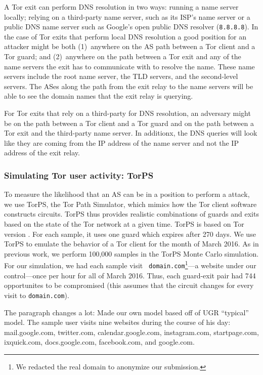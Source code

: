 A Tor exit can perform DNS resolution in two ways: running a name server
locally; relying on a third-party name server, such as its ISP's name
server or a public DNS name server such as Google's open public DNS
resolver ({\tt 8.8.8.8}).  In the case of Tor
exits that perform local DNS resolution a good position for an attacker
might be both (1)~anywhere on the AS path between a Tor client and a Tor
guard; and (2)~anywhere on the path between a Tor exit and any of the
name servers the exit has to communicate with to resolve the name.
These name servers include the root name server, the TLD servers, and
the second-level servers.  The ASes along the path from the exit relay
to the name servers will be able to see the domain names that the exit
relay is querying.

For Tor exits that rely on a third-party for DNS resolution, an
adversary might be on the path between a Tor client and a
Tor guard and on the path between a Tor exit and the third-party name
server.  In additionx, the DNS queries will look like they are coming
from the IP address of the name server and not the IP address of the
exit relay.

\subsubsection{Simulating Tor user activity: TorPS}

To measure the likelihood that an AS can be in a position to perform a
\name attack, we use TorPS, the Tor Path Simulator, which mimics how the
Tor client software constructs circuits.  TorPS thus provides realistic
combinations of guards and exits based on the state of the Tor network
at a given time. TorPS is based on Tor version . For each sample,
it uses one guard which expires after 270 days. We use TorPS to emulate
the behavior of a Tor client for the month of March 2016.  As in
previous work, we perform 100,000 samples in the TorPS Monte Carlo
simulation.  For our simulation, we had each sample visit {\tt
  domain.com}\footnote{We redacted the real domain to anonymize our
  submission.}---a website under our control---once per hour for all of
March 2016.  Thus, each guard-exit pair had 744 opportunites to be
compromised (this assumes that the circuit changes for every visit to
{\tt domain.com}).

The paragraph changes a lot: Made our own model based off of UGR ``typical'' model.  
The sample user visits nine websites during the course of his day: mail.google.com, 
twitter.com, calendar.google.com, instagram.com, startpage.com, ixquick.com, docs.google.com, 
facebook.com, and google.com.  

